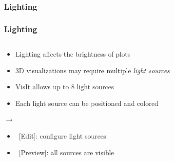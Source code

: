 \begin{frame}
\begin{columns}
\begin{column}{4.5cm}
\end{column}
\end{columns}
\end{frame}


\subsubsection{Lighting}
\begin{frame}
\frametitle{Lighting}
\vspace{-5mm}
\begin{columns}[T]
\begin{column}{6cm}
\begin{itemize}
        \item Lighting affects the brightness of plots
        \item 3D visualizations may require multiple \textit{light sources}
        \item VisIt allows up to 8 light sources
        \item Each light source can be positioned and colored
\end{itemize}

	\pause
        \textcolor{DarkBlue}{}
         $\rightarrow$ 

	\pause
        \vspace{-1.5mm}
	\begin{block}{}
	\begin{itemize}
	\item ~[Edit]: configure light sources
	\item ~[Preview]: all sources are visible
	\end{itemize}


\end{block}
\end{column}
\end{columns}
\end{frame}
